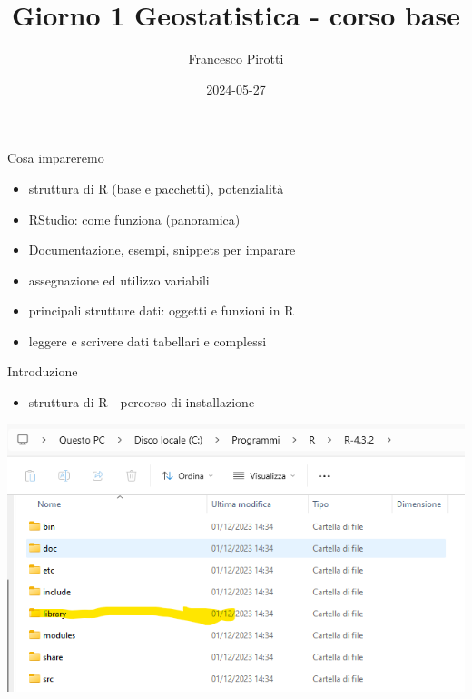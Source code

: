 \documentclass[
  ignorenonframetext,
]{beamer}
\title{Giorno 1 Geostatistica - corso base}
\author{Francesco Pirotti}
\date{2024-05-27}
\providecommand{\tightlist}{%
  \setlength{\itemsep}{0pt}\setlength{\parskip}{0pt}}
\begin{document}
\frame{\titlepage}

\begin{frame}{Cosa impareremo}
\protect\hypertarget{cosa-impareremo}{}
\begin{itemize}
\tightlist
\item
  struttura di R (base e pacchetti), potenzialità
\item
  RStudio: come funziona (panoramica)
\item
  Documentazione, esempi, snippets per imparare
\item
  assegnazione ed utilizzo variabili
\item
  principali strutture dati: oggetti e funzioni in R
\item
  leggere e scrivere dati tabellari e complessi
\end{itemize}
\end{frame}

\begin{frame}{Introduzione}
\protect\hypertarget{introduzione}{}
\begin{itemize}
\tightlist
\item
  struttura di R - percorso di installazione
\end{itemize}

\includegraphics{images/clipboard-431216307.png}
\end{frame}
\end{document}
